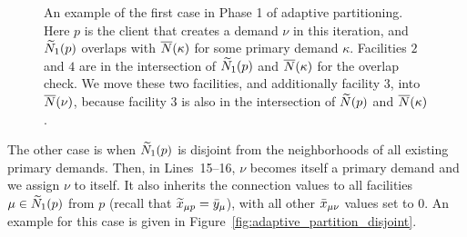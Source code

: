 \documentclass[oneside,final]{ucr}
\def\dsp{\def\baselinestretch{2.0}\large\normalsize}
\def\ssp{\def\baselinestretch{1.0}\large\normalsize}
\begin{document}
\begin{figure}[ht]
      \caption[An example of the first case in Phase 1 of
      adaptive partitioning.]{An example of the first case
        in Phase 1 of adaptive partitioning. Here $p$ is the
        client that creates a demand $\nu$ in this
        iteration, and ${\widetilde N}_1(p)$ overlaps with
        ${\overline{N}}(\kappa)$ for some primary demand
        $\kappa$. Facilities $2$ and $4$ are in the
        intersection of ${\widetilde N}_1(p)$ and ${\overline{N}}(\kappa)$
        for the overlap check. We move these two facilities,
        and additionally facility $3$, into ${\overline{N}}(\nu)$,
        because facility $3$ is also in the intersection of
        ${\widetilde N}(p)$ and ${\overline{N}}(\kappa)$.}
  \label{fig:adaptive_partition_overlap}
\end{figure}
\dsp
The other case is when
${\widetilde N}_1(p)$ is disjoint from the neighborhoods of all
existing primary demands. Then, in Lines~15--16, $\nu$
becomes itself a primary demand and we assign $\nu$ to
itself. It also inherits the connection values to all
facilities $\mu\in{\widetilde N}_1(p)$ from $p$ (recall that
${\widetilde x}_{\mu p} = {\bar y}_{\mu}$), with all other
${\bar x}_{\mu\nu}$ values set to $0$. An example for this case
is given in Figure~\ref{fig:adaptive_partition_disjoint}.
\ssp
\end{document}
